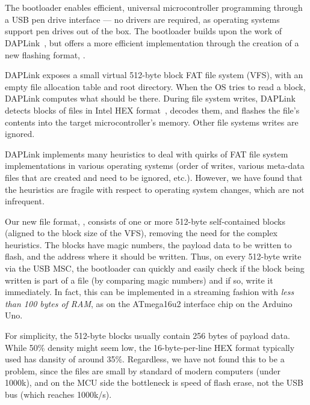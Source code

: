 \section{\UF}
\label{sec:uf2}

The \UF bootloader enables efficient, universal microcontroller programming through a USB pen drive interface --- no drivers are required, as operating systems support pen drives out of the box. The \UF bootloader builds upon the work of DAPLink~\cite{GitHubAR5:online}, but offers a more efficient implementation through the creation of a new flashing format, \UF.

DAPLink exposes a small virtual 512-byte block FAT file system (VFS), with an empty file allocation table and root directory. When the OS tries to read a block, DAPLink computes what should be there. During file system writes, DAPLink detects blocks of files in Intel HEX format~\cite{IntelHEX}, decodes them, and flashes the file's contents into the target microcontroller's memory. Other file systems writes are ignored.

DAPLink implements many heuristics to deal with quirks of FAT file
system implementations in various operating systems (order of writes, various meta-data files that are created and need to be ignored, etc.).  However, we have found that the heuristics are fragile with respect to operating system changes, which are not infrequent.

Our new file format, \UF, consists of one or more 512-byte self-contained blocks (aligned to the block size of the VFS), removing the need for the complex heuristics. The blocks have magic numbers, the payload data to be written to flash, and the address where it should be written. Thus, on every 512-byte write via the USB MSC, the bootloader can quickly and easily check if the block being written is part of a \UF file (by comparing magic numbers) and if so, write it immediately. In fact, this can be implemented in a streaming fashion with \emph{less than 100 bytes of RAM}, as on the ATmega16u2 interface chip on the Arduino Uno.

For simplicity, the 512-byte \UF blocks usually contain 256 bytes of payload data. While 50\% density might seem low, the 16-byte-per-line HEX format typically used has dansity of around 35\%. Regardless, we have not found this to be a problem, since the files are small by standard of modern computers (under 1000k), and on the MCU side the bottleneck is speed of flash erase, not the USB bus (which reaches 1000k/s).

